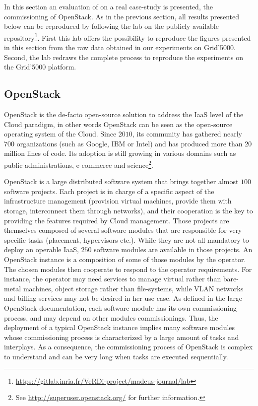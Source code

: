 \graphicspath{{images/}}

In this section an evaluation of \mad on a real case-study is
presented, the commissioning of OpenStack. As in the previous section,
all results presented below can be reproduced by following the lab on
the publicly available repository\footnote{\url{https://gitlab.inria.fr/VeRDi-project/madeus-journal/lab}}. First
this lab offers the possibility to reproduce the figures presented in
this section from the raw data obtained in our experiments on
Grid'5000. Second, the lab redraws the complete process to reproduce
the experiments on the Grid'5000 platform.

\subsection{OpenStack}
\label{subsec:openstack}

OpenStack is the de-facto open-source solution to address the IaaS
level of the Cloud paradigm, in other words OpenStack can be seen as
the open-source operating system of the Cloud. Since $2010$, its
community has gathered nearly $700$ organizations (such as Google, IBM
or Intel) and has produced more than $20$ million lines of code. Its
adoption is still growing in various domains such as public
administrations, e-commerce and science\footnote{See
  \url{http://superuser.openstack.org/} for further information.}.

OpenStack is a large distributed software system that brings together
almost $100$ software projects. Each project is in charge of a
specific aspect of the infrastructure management (\eg provision
virtual machines, provide them with storage, interconnect them through
networks), and their cooperation is the key to providing the features
required by Cloud management.
%
Those projects are themselves composed of several software modules
that are responsible for very specific tasks (\eg placement,
hypervisors etc.). While they are not all mandatory to deploy an
operable IaaS, $250$ software modules are available in those projects.
%
An OpenStack instance is a composition of some of those modules by the
operator. The chosen modules then cooperate to respond to the operator
requirements. For instance, the operator may need services to manage
virtual rather than bare-metal machines, object storage rather than
file-systems, while VLAN networks and billing services may not be
desired in her use case. As defined in the large OpenStack
documentation, each software module has its own commissioning process,
and may depend on other modules commissionings.
%
Thus, the deployment of a typical OpenStack instance implies many
software modules whose commissioning process is characterized by a
large amount of tasks and interplays. As a consequence, the
commissioning process of OpenStack is complex to understand and can be
very long when tasks are executed sequentially.

